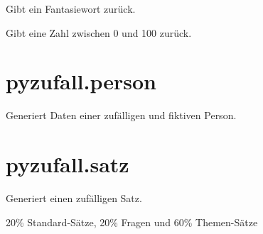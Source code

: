 \documentclass[a4paper,12pt,oneside]{sphinxmanual}
\begin{document}

\begin{fulllineitems}
\label{module:pyzufall.generator.wort}
Gibt ein Fantasiewort zurück.

\end{fulllineitems}


\begin{fulllineitems}
\label{module:pyzufall.generator.zahl}
Gibt eine Zahl zwischen 0 und 100 zurück.

\end{fulllineitems}



\section{pyzufall.person}
\label{module:module-pyzufall.person}\label{module:pyzufall-person}

\begin{fulllineitems}
\label{module:pyzufall.person.Person}
Generiert Daten einer zufälligen und fiktiven Person.


\end{fulllineitems}



\section{pyzufall.satz}
\label{module:module-pyzufall.satz}\label{module:pyzufall-satz}

\begin{fulllineitems}
\label{module:pyzufall.satz.satz}
Generiert einen zufälligen Satz.

20\% Standard-Sätze, 20\% Fragen und 60\% Themen-Sätze

\end{fulllineitems}

\end{document}
